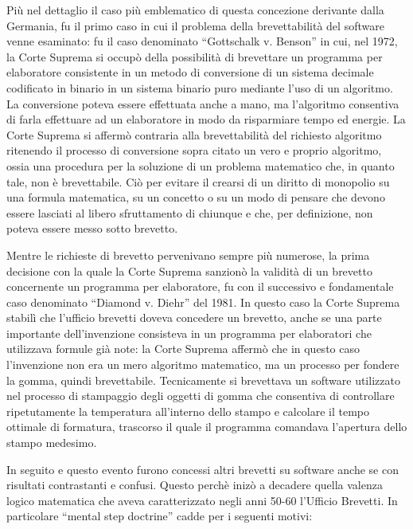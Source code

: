 Più nel dettaglio il caso più emblematico di questa concezione derivante dalla Germania, fu il primo caso in cui il problema della brevettabilità del software venne esaminato: fu il caso denominato ``Gottschalk v. Benson'' in cui, nel 1972, la Corte Suprema si occupò della possibilità di brevettare un programma per elaboratore consistente in un metodo di conversione di un sistema decimale codificato in binario in un sistema binario puro mediante l'uso di un algoritmo. La conversione poteva essere effettuata anche a mano, ma l'algoritmo consentiva di farla effettuare ad un elaboratore in modo da risparmiare tempo ed energie. La Corte Suprema si affermò contraria alla brevettabilità del richiesto algoritmo ritenendo il processo di conversione sopra citato un vero e proprio algoritmo, ossia una procedura per la soluzione di un problema matematico che, in quanto tale, non è brevettabile. Ciò per evitare il crearsi di un diritto di monopolio su una formula matematica, su un concetto o su un modo di pensare che devono essere lasciati al libero sfruttamento di chiunque e che, per definizione, non poteva essere messo sotto brevetto.

Mentre le richieste di brevetto pervenivano sempre più numerose, la prima decisione con la quale la Corte Suprema sanzionò la validità di un brevetto concernente un programma per elaboratore, fu con il successivo e fondamentale caso denominato ``Diamond v. Diehr'' del 1981. In questo caso la Corte Suprema stabilì che l'ufficio brevetti doveva concedere un brevetto, anche se una parte importante dell'invenzione consisteva in un programma per elaboratori che utilizzava formule già note: la Corte Suprema affermò che in questo caso l'invenzione non era un mero algoritmo matematico, ma un processo per fondere la gomma, quindi brevettabile. Tecnicamente si brevettava un software utilizzato nel processo di stampaggio degli oggetti di gomma che consentiva di controllare ripetutamente la temperatura all'interno dello stampo e calcolare il tempo ottimale di formatura, trascorso il quale il programma comandava l'apertura dello stampo medesimo.

In seguito e questo evento furono concessi altri brevetti su software anche se con risultati contrastanti e confusi. Questo perchè inizò a decadere quella valenza logico matematica che aveva caratterizzato negli anni 50-60 l'Ufficio Brevetti. In particolare ``mental step doctrine'' cadde per i seguenti motivi:

